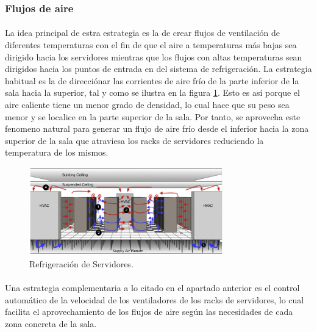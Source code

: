 \documentclass[10pt]{article}
\begin{document}
			\subsubsection{Flujos de aire}

	 			\paragraph{}
				La idea principal de estra estrategia es la de crear flujos de ventilación de diferentes temperaturas con el fin de que el aire a temperaturas más bajas sea dirigido hacia los servidores mientras que los flujos con altas temperaturas sean dirigidos hacia los puntos de entrada en del sistema de refrigeración. La estrategia habitual es la de direcciónar las corrientes de aire frío de la parte inferior de la sala hacia la superior, tal y como se ilustra en la figura \ref{image:refrigeration}. Esto es así porque el aire caliente tiene un menor grado de densidad, lo cual hace que su peso sea menor y se localice en la parte superior de la sala. Por tanto, se aprovecha este fenomeno natural para generar un flujo de aire frío desde el inferior hacia la zona superior de la sala que atraviesa los racks de servidores reduciendo la temperatura de los mismos.

				\begin{figure}[htpb!]
					\begin{center}
						\includegraphics[width=0.75\textwidth]{refrigeration}
						\caption{Refrigeración de Servidores.\cite{cisco:guide}}
						\label{image:refrigeration}
					\end{center}
				\end{figure}

				\paragraph{}
				Una estrategia complementaria a lo citado en el apartado anterior es el control automático de la velocidad de los ventiladores de los racks de servidores, lo cual facilita el aprovechamiento de los flujos de aire según las necesidades de cada zona concreta de la sala.
\end{document}
